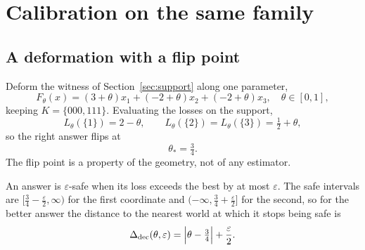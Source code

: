 
\section{Calibration on the same family}
\label{sec:calibration}

\subsection{A deformation with a flip point}

Deform the witness of Section~\ref{sec:support} along one parameter,
\begin{equation}
F_{\theta}(x)=(3+\theta)x_{1}+(-2+\theta)x_{2}+(-2+\theta)x_{3},\quad\theta\in[0,1],
\label{eq:thetafamily}
\end{equation}
keeping $K=\{000,111\}$. Evaluating the losses on the support,
\begin{equation}
L_{\theta}(\{1\})=2-\theta,\qquad L_{\theta}(\{2\})=L_{\theta}(\{3\})=\tfrac12+\theta,
\label{eq:thetalosses}
\end{equation}
so the right answer flips at
\begin{equation}
\theta_{*}=\tfrac34 .
\label{eq:flip}
\end{equation}
The flip point is a property of the geometry, not of any estimator.


An answer is $\varepsilon$-safe when its loss exceeds the best by at most $\varepsilon$.
The safe intervals are $[\tfrac34-\tfrac{\varepsilon}{2},\infty)$ for the first coordinate
and $(-\infty,\tfrac34+\tfrac{\varepsilon}{2}]$ for the second, so for the better answer
the distance to the nearest world at which it stops being safe is
\begin{equation}
\Delta_{\rm dec}(\theta,\varepsilon)=\Bigl|\theta-\tfrac34\Bigr|+\frac{\varepsilon}{2}.
\label{eq:deltadec}
\end{equation}


